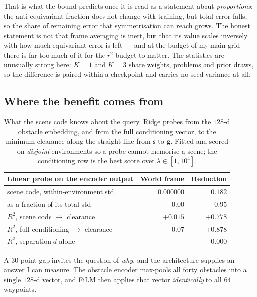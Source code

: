 \documentclass[11pt,a4paper]{article}
\newcommand{\toprule}{\hline}
\newcommand{\midrule}{\hline}
\newcommand{\bottomrule}{\hline}
\newcommand{\svec}{\mathbf{s}}
\newcommand{\gvec}{\mathbf{g}}
\begin{document}
That is what the bound predicts once it is read as a statement about
\emph{proportions}: the anti-equivariant fraction does not change with training,
but total error falls, so the share of remaining error that symmetrisation can
reach grows. The honest statement is not that frame averaging is inert, but that
its value scales inversely with how much equivariant error is left --- and at the
budget of my main grid there is far too much of it for the $r^2$ budget to
matter. The statistics are unusually strong here: $K{=}1$ and $K{=}3$ share
weights, problems and prior draws, so the difference is paired within a
checkpoint and carries no seed variance at all.

\subsection{Where the benefit comes from}
\label{sec:mechanism}

\begin{table}[t]
\centering
\begin{tabular}{lrr}
\toprule
Linear probe on the encoder output & World frame & Reduction \\
\midrule
scene code, within-environment std        & $0.000000$ & $0.182$ \\
\quad as a fraction of its total std       & $0.00$     & $0.95$ \\
$R^2$, scene code $\to$ clearance          & $+0.015$   & $\mathbf{+0.778}$ \\
$R^2$, full conditioning $\to$ clearance   & $+0.07$    & $\mathbf{+0.878}$ \\
$R^2$, separation $d$ alone                & ---        & $0.000$ \\
\bottomrule
\end{tabular}
\caption{What the scene code knows about the query. Ridge probes from the
$128$-d obstacle embedding, and from the full conditioning vector, to the minimum
clearance along the straight line from $\svec$ to $\gvec$. Fitted and scored on
\emph{disjoint} environments so a probe cannot memorise a scene; the conditioning
row is the best score over $\lambda \in [1, 10^4]$.}
\label{tab:probe}
\end{table}

A $30$-point gap invites the question of \emph{why}, and the architecture
supplies an answer I can measure. The obstacle encoder max-pools all forty
obstacles into a single $128$-d vector, and FiLM then applies that vector
\emph{identically} to all $64$ waypoints.
\end{document}
